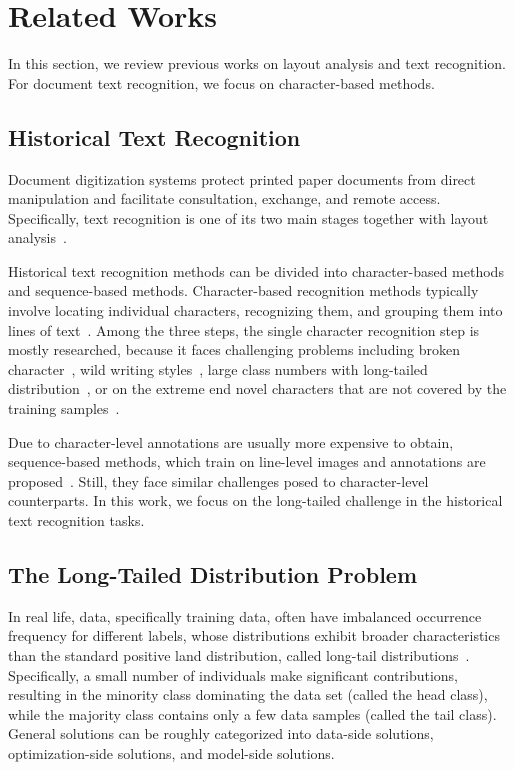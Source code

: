 
\section{Related Works}
\label{sec:formatting}
In this section, we review previous works on layout analysis and text recognition. For document text recognition, we focus on character-based methods.


\subsection{Historical Text Recognition}
Document digitization systems protect printed paper documents from direct manipulation and facilitate consultation, exchange, and remote access. Specifically, text recognition is one of its two main stages together with layout analysis~\cite{jla}.

Historical text recognition methods can be divided into character-based methods and sequence-based methods. 
Character-based recognition methods typically involve locating individual characters, recognizing them, and grouping them into lines of text~\cite{papytwin}. 
Among the three steps, the single character recognition step is mostly researched, because it faces challenging problems including broken character~\cite{broken}, wild writing styles~\cite{obc306}, large class numbers with long-tailed distribution~\cite{fewran}, or on the extreme end novel characters that are not covered by the training samples~\cite{hde,ligarature}.

Due to character-level annotations are usually more expensive to obtain,  sequence-based methods, which train on line-level images and annotations are proposed~\cite{eccvfork,jinic21}. Still, they face similar challenges posed to character-level counterparts. In this work, we focus on the long-tailed challenge in the historical text recognition tasks.

\subsection{The Long-Tailed Distribution Problem}


In real life, data, specifically training data, often have imbalanced occurrence frequency for different labels, whose distributions exhibit broader characteristics than the standard positive land distribution, called long-tail distributions~\cite{tailsurvey}. 
Specifically, a small number of individuals make significant contributions, resulting in the minority class dominating the data set (called the head class), while the majority class contains only a few data samples (called the tail class). 
General solutions can be roughly categorized into data-side solutions, optimization-side solutions, and model-side solutions.


